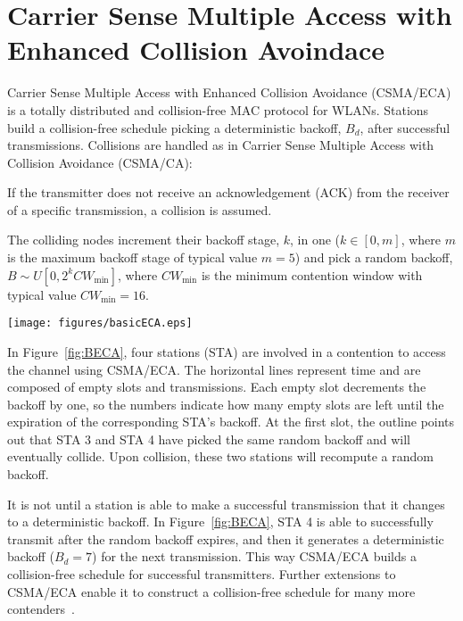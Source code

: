 \documentclass[conference]{IEEEtran}
\begin{document}
\section{Carrier Sense Multiple Access with Enhanced Collision Avoindace}

Carrier Sense Multiple Access with Enhanced Collision Avoidance (CSMA/ECA) is a totally distributed and collision-free MAC protocol for WLANs. Stations build a collision-free schedule picking a deterministic backoff, $B_{d}$, after successful transmissions. Collisions are handled as in Carrier Sense Multiple Access with Collision Avoidance (CSMA/CA):
\begin{compactitem}
	\item If the transmitter does not receive an acknowledgement (ACK) from the receiver of a specific transmission, a collision is assumed.
	\item The colliding nodes increment their backoff stage, $k$, in one ($k\in[0,m]$, where $m$ is the maximum backoff stage of typical value $m=5$) and pick a random backoff, $B\sim U[0,2^{k}CW_{\min}]$, where $CW_{\min}$ is the minimum contention window with typical value $CW_{\min}=16$.
\end{compactitem}

	\begin{figure*}[tb]
		\centering
		\texttt{[image: figures/basicECA.eps]}
		\caption{CSMA/ECA with four stations in saturation. ($B_{d}=7$.)}
		\label{fig:BECA}
	\end{figure*}

In Figure~\ref{fig:BECA}, four stations (STA) are involved in a contention to access the channel using CSMA/ECA. The horizontal lines represent time and are composed of empty slots and transmissions. Each empty slot decrements the backoff by one, so the numbers indicate how many empty slots are left until the expiration of the corresponding STA's backoff. At the first slot, the outline points out that STA 3 and STA 4 have picked the same random backoff and will eventually collide. Upon collision, these two stations will recompute a random backoff.

It is not until a station is able to make a successful transmission that it changes to a deterministic backoff. In Figure~\ref{fig:BECA}, STA 4 is able to successfully transmit after the random backoff expires, and then it generates a deterministic backoff ($B_{d}=7$) for the next transmission. This way CSMA/ECA builds a collision-free schedule for successful transmitters. Further extensions to CSMA/ECA enable it to construct a collision-free schedule for many more contenders~\cite{research2standards}.
\end{document}

